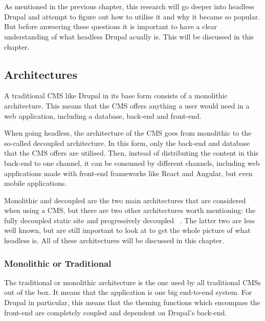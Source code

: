 \chapter{}
\label{ch:stand-van-zaken}



As mentioned in the previous chapter, this research will go deeper into headless Drupal and attempt to figure out how to utilise it and why it became so popular. But before anwsering these questions it is important to have a clear understanding of what headless Drupal acually is. This will be discussed in this chapter. 

\section{Architectures}
A traditional CMS like Drupal in its base form consists of a monolithic architecture. This means that the CMS offers anything a user would need in a web application, including a database, back-end and front-end.

When going headless, the architecture of the CMS goes from monolithic to the so-called decoupled architecture. In this form, only the back-end and database that the CMS offers are utilised. Then, instead of distributing the content in this back-end to one channel, it can be consumed by different channels, including web applications made with front-end frameworks like React and Angular, but even mobile applications.

Monolithic and decoupled are the two main architectures that are considered when using a CMS, but there are two other architectures worth mentioning: the fully decoupled static site and progressively decoupled ~\autocite{Dropsolid2021}. The latter two are less well known, but are still important to look at to get the whole picture of what headless is. All of these architectures will be discussed in this chapter.

\subsection{Monolithic or Traditional}
The traditional or monolithic architecture is the one used by all traditional CMSs out of the box. It means that the application is one big end-to-end system. For Drupal in particular, this means that the theming functions which encompass the front-end are completely coupled and dependent on Drupal's back-end.

